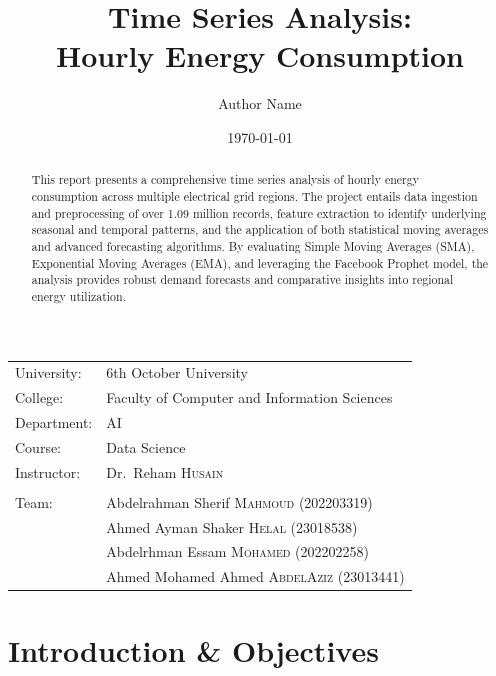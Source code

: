 \documentclass[
	letterpaper, %
	10pt, %
]{CSUniSchoolLabReport}
\title{Time Series Analysis: \\ Hourly Energy Consumption} %
\author{Author Name} %
\date{\today} %
\begin{document}
\maketitle %

\begin{center}
	\begin{tabular}{l l}
		University: & 6th October University \\
		College: & Faculty of Computer and Information Sciences \\
		Department: & AI \\
		Course: & Data Science \\
		Instructor: & Dr.\ Reham \textsc{Husain} \\
		& \\
		Team: & Abdelrahman Sherif \textsc{Mahmoud} (202203319) \\
		& Ahmed Ayman Shaker \textsc{Helal} (23018538) \\
		& Abdelrhman Essam \textsc{Mohamed} (202202258) \\
		& Ahmed Mohamed Ahmed \textsc{AbdelAziz} (23013441)
	\end{tabular}
\end{center}

\begin{abstract}
This report presents a comprehensive time series analysis of hourly energy consumption across multiple electrical grid regions. The project entails data ingestion and preprocessing of over 1.09 million records, feature extraction to identify underlying seasonal and temporal patterns, and the application of both statistical moving averages and advanced forecasting algorithms. By evaluating Simple Moving Averages (SMA), Exponential Moving Averages (EMA), and leveraging the Facebook Prophet model, the analysis provides robust demand forecasts and comparative insights into regional energy utilization.
\end{abstract}


\section{Introduction \& Objectives}
\end{document}
